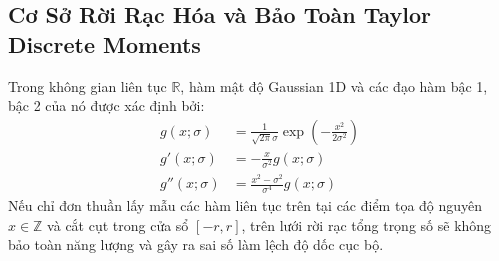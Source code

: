 \subsection{Cơ Sở Rời Rạc Hóa và Bảo Toàn Taylor Discrete Moments}
Trong không gian liên tục $\mathbb{R}$, hàm mật độ Gaussian 1D và các đạo hàm bậc 1, bậc 2 của nó được xác định bởi:
\begin{align}
g(x; \sigma) &= \frac{1}{\sqrt{2\pi}\sigma} \exp\left(-\frac{x^2}{2\sigma^2}\right) \label{eq:gauss0} \\
g'(x; \sigma) &= -\frac{x}{\sigma^2} g(x; \sigma) \label{eq:gauss1} \\
g''(x; \sigma) &= \frac{x^2 - \sigma^2}{\sigma^4} g(x; \sigma) \label{eq:gauss2}
\end{align}
Nếu chỉ đơn thuần lấy mẫu các hàm liên tục trên tại các điểm tọa độ nguyên $x \in \mathbb{Z}$ và cắt cụt trong cửa sổ $[-r, r]$, trên lưới rời rạc tổng trọng số sẽ không bảo toàn năng lượng và gây ra sai số làm lệch độ dốc cục bộ.

